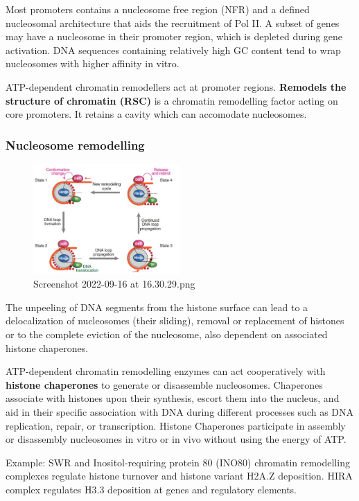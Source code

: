 Most promoters contains a nucleosome free region (NFR) and a defined nucleosomal architecture that aids the recruitment of Pol II. A subset of genes may have a nucleosome in their promoter region, which is depleted during gene activation. DNA sequences containing relatively high GC content tend to wrap nucleosomes with higher affinity in vitro.

ATP-dependent chromatin remodellers act at promoter regions. \textbf{Remodels the structure of chromatin (RSC)} is a chromatin remodelling factor acting on core promoters. It retains a cavity which can accomodate nucleosomes.

\hypertarget{nucleosome-remodelling}{%
\subsubsection{Nucleosome remodelling}\label{nucleosome-remodelling}}

\begin{figure}
\centering
\includegraphics[width=0.5\textwidth]{../_resources/Screenshot_2022-09-16_at_16-30-29.png}
\caption{Screenshot 2022-09-16 at 16.30.29.png}
\end{figure}

The unpeeling of DNA segments from the histone surface can lead to a delocalization of nucleosomes (their sliding), removal or replacement of histones or to the complete eviction of the nucleosome, also dependent on associated histone chaperones.

ATP-dependent chromatin remodelling enzymes can act cooperatively with \textbf{histone chaperones} to generate or disassemble nucleosomes. Chaperones associate with histones upon their synthesis, escort them into the nucleus, and aid in their specific association with DNA during different processes such as DNA replication, repair, or transcription. Histone Chaperones participate in assembly or disassembly nucleosomes in vitro or in vivo without using the energy of ATP.

Example: SWR and Inositol-requiring protein 80 (INO80) chromatin remodelling complexes regulate histone turnover and histone variant H2A.Z deposition. HIRA complex regulates H3.3 deposition at genes and regulatory elements.

